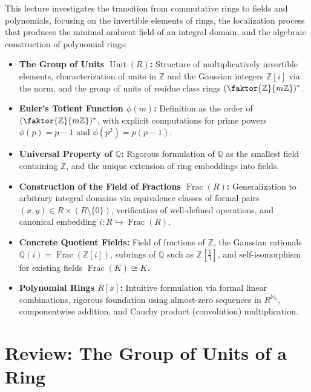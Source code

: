 \begin{overview}
This lecture investigates the transition from commutative rings to fields and polynomials, focusing on the invertible elements of rings, the localization process that produces the minimal ambient field of an integral domain, and the algebraic construction of polynomial rings:
\begin{itemize}
    \item \textbf{The Group of Units $\operatorname{Unit}(R)$:} Structure of multiplicatively invertible elements, characterization of units in $\mathbb{Z}$ and the Gaussian integers $\mathbb{Z}[i]$ via the norm, and the group of units of residue class rings $(\faktor{\mathbb{Z}}{m\mathbb{Z}})^*$.
    \item \textbf{Euler's Totient Function $\phi(m)$:} Definition as the order of $(\faktor{\mathbb{Z}}{m\mathbb{Z}})^*$, with explicit computations for prime powers $\phi(p) = p-1$ and $\phi(p^2) = p(p-1)$.
    \item \textbf{Universal Property of $\mathbb{Q}$:} Rigorous formulation of $\mathbb{Q}$ as the smallest field containing $\mathbb{Z}$, and the unique extension of ring embeddings into fields.
    \item \textbf{Construction of the Field of Fractions $\operatorname{Frac}(R)$:} Generalization to arbitrary integral domains via equivalence classes of formal pairs $(x, y) \in R \times (R \setminus \{0\})$, verification of well-defined operations, and canonical embedding $i \colon R \hookrightarrow \operatorname{Frac}(R)$.
    \item \textbf{Concrete Quotient Fields:} Field of fractions of $\mathbb{Z}$, the Gaussian rationals $\mathbb{Q}(i) = \operatorname{Frac}(\mathbb{Z}[i])$, subrings of $\mathbb{Q}$ such as $\mathbb{Z}[\frac{1}{3}]$, and self-isomorphism for existing fields $\operatorname{Frac}(K) \cong K$.
    \item \textbf{Polynomial Rings $R[x]$:} Intuitive formulation via formal linear combinations, rigorous foundation using almost-zero sequences in $R^{\mathbb{N}_0}$, componentwise addition, and Cauchy product (convolution) multiplication.
\end{itemize}
\end{overview}

\section{Review: The Group of Units of a Ring}


